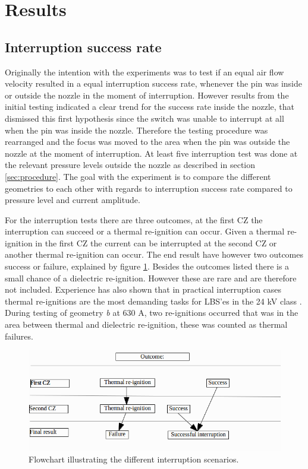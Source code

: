 \documentclass[10pt,a4paper]{article} %
\begin{document}
\section{Results}
\subsection{Interruption success rate}
Originally the intention with the experiments was to test if an equal air flow velocity resulted in a equal interruption success rate, whenever the pin was inside or outside the nozzle in the moment of interruption. However results from the initial testing indicated a clear trend for the success rate inside the nozzle, that dismissed this first hypothesis since the switch was unable to interrupt at all when the pin was inside the nozzle. Therefore the testing procedure was rearranged and the focus was moved to the area when the pin was outside the nozzle at the moment of interruption. At least five interruption test was done at the relevant pressure levels outside the nozzle as described in section \ref{sec:procedure}. The goal with the experiment is to compare the different geometries to each other with regards to interruption success rate compared to pressure level and current amplitude.

For the interruption tests there are three outcomes, at the first CZ the interruption can succeed or a thermal re-ignition can occur. Given a thermal re-ignition in the first CZ the current can be interrupted at the second CZ or another thermal re-ignition can occur. The end result have however two outcomes success or failure, explained by figure \ref{fig:pilSuccessOfFail}. Besides the outcomes listed there is a small chance of a dielectric re-ignition. However these are rare and are therefore not included. Experience has also shown that in practical interruption cases thermal re-ignitions are the most demanding tasks for LBS'es in the 24 kV class \cite{bib:AFIMVLBA}. During testing of geometry \textit{b} at 630 A, two re-ignitions occurred that was in the area between thermal and dielectric re-ignition, these was counted as thermal failures.

\begin{figure}[H]
\centering
\includegraphics[scale=0.6]{Bilder/Results/interruptionFlowChart.png}
\caption{Flowchart illustrating the different interruption scenarios.} \label{fig:pilSuccessOfFail}
\end{figure}
\end{document}

